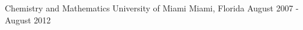

\begin{cventries}

  \cventry
    {Chemistry and Mathematics} %
    {University of Miami} %
    {Miami, Florida} %
    {August 2007 - August 2012} %
    {}

\end{cventries}

